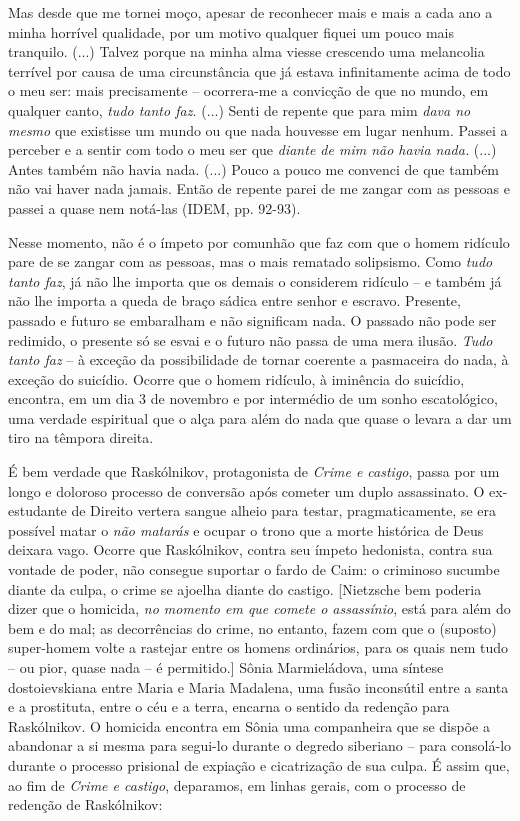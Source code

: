 Mas desde que me tornei moço, apesar de reconhecer mais e mais a cada
ano a minha horrível qualidade, por um motivo qualquer fiquei um pouco
mais tranquilo. (...) Talvez porque na minha alma viesse crescendo uma
melancolia terrível por causa de uma circunstância que já estava
infinitamente acima de todo o meu ser: mais precisamente -- ocorrera-me
a convicção de que no mundo, em qualquer canto, \emph{tudo tanto faz.}
(...) Senti de repente que para mim \emph{dava no mesmo} que existisse
um mundo ou que nada houvesse em lugar nenhum. Passei a perceber e a
sentir com todo o meu ser que \emph{diante de mim não havia nada.} (...)
Antes também não havia nada. (...) Pouco a pouco me convenci de que
também não vai haver nada jamais. Então de repente parei de me zangar
com as pessoas e passei a quase nem notá-las (IDEM, pp. 92-93).

Nesse momento, não é o ímpeto por comunhão que faz com que o homem
ridículo pare de se zangar com as pessoas, mas o mais rematado
solipsismo. Como \emph{tudo tanto faz}, já não lhe importa que os demais
o considerem ridículo -- e também já não lhe importa a queda de braço
sádica entre senhor e escravo. Presente, passado e futuro se embaralham
e não significam nada. O passado não pode ser redimido, o presente só se
esvai e o futuro não passa de uma mera ilusão. \emph{Tudo tanto faz} --
à exceção da possibilidade de tornar coerente a pasmaceira do nada, à
exceção do suicídio. Ocorre que o homem ridículo, à iminência do
suicídio, encontra, em um dia 3 de novembro e por intermédio de um sonho
escatológico, uma verdade espiritual que o alça para além do nada que
quase o levara a dar um tiro na têmpora direita.

É bem verdade que Raskólnikov, protagonista de \emph{Crime e castigo},
passa por um longo e doloroso processo de conversão após cometer um
duplo assassinato. O ex-estudante de Direito vertera sangue alheio para
testar, pragmaticamente, se era possível matar o \emph{não matarás} e
ocupar o trono que a morte histórica de Deus deixara vago. Ocorre que
Raskólnikov, contra seu ímpeto hedonista, contra sua vontade de poder,
não consegue suportar o fardo de Caim: o criminoso sucumbe diante da
culpa, o crime se ajoelha diante do castigo. {[}Nietzsche bem poderia
dizer que o homicida, \emph{no momento em que comete o assassínio}, está
para além do bem e do mal; as decorrências do crime, no entanto, fazem
com que o (suposto) super-homem volte a rastejar entre os homens
ordinários, para os quais nem tudo -- ou pior, quase nada -- é
permitido.{]} Sônia Marmieládova, uma síntese dostoievskiana entre Maria
e Maria Madalena, uma fusão inconsútil entre a santa e a prostituta,
entre o céu e a terra, encarna o sentido da redenção para Raskólnikov. O
homicida encontra em Sônia uma companheira que se dispõe a abandonar a
si mesma para segui-lo durante o degredo siberiano -- para consolá-lo
durante o processo prisional de expiação e cicatrização de sua culpa. É
assim que, ao fim de \emph{Crime e castigo}, deparamos, em linhas
gerais, com o processo de redenção de Raskólnikov:

